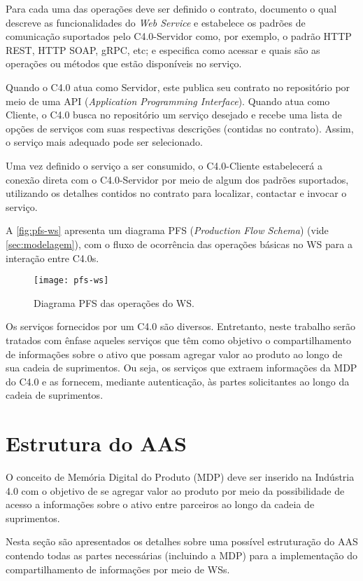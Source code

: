 Para cada uma das operações deve ser definido o contrato, documento o qual descreve as funcionalidades do \textit{Web Service} e estabelece os padrões de comunicação suportados pelo C4.0-Servidor como, por exemplo, o padrão HTTP REST, HTTP SOAP, gRPC, etc; e especifica como acessar e quais são as operações ou métodos que estão disponíveis no serviço.

Quando o C4.0 atua como Servidor, este publica seu contrato no repositório por meio de uma API (\textit{Application Programming Interface}). Quando atua como Cliente, o C4.0 busca no repositório um serviço desejado e recebe uma lista de opções de serviços com suas respectivas descrições (contidas no contrato). Assim, o serviço mais adequado pode ser selecionado.

Uma vez definido o serviço a ser consumido, o C4.0-Cliente estabelecerá a conexão direta com o C4.0-Servidor por meio de algum dos padrões suportados, utilizando os detalhes contidos no contrato para localizar, contactar e invocar o serviço.

A \autoref{fig:pfs-ws} apresenta um diagrama PFS (\textit{Production Flow Schema}) (vide \autoref{sec:modelagem}), com o fluxo de ocorrência das operações básicas no WS para a interação entre C4.0s.

\begin{figure}[htb]
	\centering
	\texttt{[image: pfs-ws]}
	\caption{Diagrama PFS das operações do WS.}
	\label{fig:pfs-ws}
\end{figure}

Os serviços fornecidos por um C4.0 são diversos. Entretanto, neste trabalho serão tratados com ênfase aqueles serviços que têm como objetivo o compartilhamento de informações sobre o ativo que possam agregar valor ao produto ao longo de sua cadeia de suprimentos. Ou seja, os serviços que extraem informações da MDP do C4.0 e as fornecem, mediante autenticação, às partes solicitantes ao longo da cadeia de suprimentos.

\section{Estrutura do AAS}

O conceito de Memória Digital do Produto (MDP) deve ser inserido na Indústria 4.0 com o objetivo de se agregar valor ao produto por meio da possibilidade de acesso a informações sobre o ativo entre parceiros ao longo da cadeia de suprimentos.

Nesta seção são apresentados os detalhes sobre uma possível estruturação do AAS contendo todas as partes necessárias (incluindo a MDP) para a implementação do compartilhamento de informações por meio de WSs.

